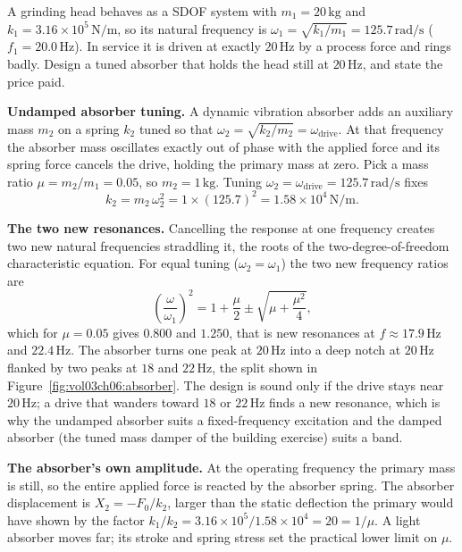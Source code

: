 A grinding head behaves as a SDOF system with $m_1 = 20\,\si{
\kilogram}$ and $k_1 = 3.16\times 10^5\,\si{\newton\per\meter}$, so its
natural frequency is $\omega_1 = \sqrt{k_1/m_1} = 125.7\,\si{\radian
\per\second}$ ($f_1 = 20.0\,\si{\hertz}$). In service it is driven at
exactly $20\,\si{\hertz}$ by a process force and rings badly. Design a
tuned absorber that holds the head still at $20\,\si{\hertz}$, and
state the price paid.

\textbf{Undamped absorber tuning.} A dynamic vibration absorber adds an
auxiliary mass $m_2$ on a spring $k_2$ tuned so that $\omega_2 =
\sqrt{k_2/m_2} = \omega_{\text{drive}}$. At that frequency the absorber
mass oscillates exactly out of phase with the applied force and its
spring force cancels the drive, holding the primary mass at zero. Pick a
mass ratio $\mu = m_2/m_1 = 0.05$, so $m_2 = 1\,\si{\kilogram}$. Tuning
$\omega_2 = \omega_{\text{drive}} = 125.7\,\si{\radian\per\second}$
fixes
\[
k_2 = m_2\,\omega_2^2 = 1\times (125.7)^2 = 1.58\times 10^4\,\si{
\newton\per\meter}.
\]

\textbf{The two new resonances.} Cancelling the response at one
frequency creates two new natural frequencies straddling it, the roots
of the two-degree-of-freedom characteristic equation. For equal tuning
($\omega_2 = \omega_1$) the two new frequency ratios are
\[
\left(\frac{\omega}{\omega_1}\right)^2 = 1 + \frac{\mu}{2} \pm
\sqrt{\mu + \frac{\mu^2}{4}},
\]
which for $\mu = 0.05$ gives $0.800$ and $1.250$, that is new
resonances at $f \approx 17.9\,\si{\hertz}$ and $22.4\,\si{\hertz}$.
The absorber turns one peak at $20\,\si{\hertz}$ into a deep notch at
$20\,\si{\hertz}$ flanked by two peaks at $18$ and $22\,\si{\hertz}$,
the split shown in Figure~\ref{fig:vol03ch06:absorber}. The design is
sound only if the drive stays near $20\,\si{\hertz}$; a drive that
wanders toward $18$ or $22\,\si{\hertz}$ finds a new resonance, which
is why the undamped absorber suits a fixed-frequency excitation and the
damped absorber (the tuned mass damper of the building exercise) suits a
band.



\textbf{The absorber's own amplitude.} At the operating frequency the
primary mass is still, so the entire applied force is reacted by the
absorber spring. The absorber displacement is $X_2 = -F_0/k_2$, larger
than the static deflection the primary would have shown by the factor
$k_1/k_2 = 3.16\times 10^5/1.58\times 10^4 = 20 = 1/\mu$. A light
absorber moves far; its stroke and spring stress set the practical
lower limit on $\mu$.

